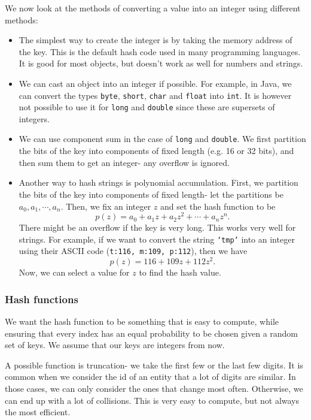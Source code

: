 \documentclass[a4paper, openany]{memoir}
\begin{document}
\noindent We now look at the methods of converting a value into an integer using different methods:
\begin{itemize}
    \item The simplest way to create the integer is by taking the memory address of the key. This is the default hash code used in many programming languages. It is good for most objects, but doesn't work as well for numbers and strings.
    \item We can cast an object into an integer if possible. For example, in Java, we can convert the types \texttt{byte}, \texttt{short}, \texttt{char} and \texttt{float} into \texttt{int}. It is however not possible to use it for \texttt{long} and \texttt{double} since these are supersets of integers.
    \item We can use component sum in the case of \texttt{long} and \texttt{double}. We first partition the bits of the key into components of fixed length (e.g. 16 or 32 bits), and then sum them to get an integer- any overflow is ignored.
    \item Another way to hash strings is polynomial accumulation. First, we partition the bits of the key into components of fixed length- let the partitions be $a_0, a_1, \cdots, a_n$. Then, we fix an integer $z$ and set the hash function to be
    \[p(z) = a_0 + a_1 z + a_2 z^2 + \cdots + a_n z^n.\]
    There might be an overflow if the key is very long. This works very well for strings. For example, if we want to convert the string \texttt{`tmp'} into an integer using their ASCII code (\texttt{t:116, m:109, p:112}), then we have
    \[p(z) = 116 + 109z + 112z^2.\]
    Now, we can select a value for $z$ to find the hash value.
\end{itemize}

\subsubsection{Hash functions}
We want the hash function to be something that is easy to compute, while ensuring that every index has an equal probability to be chosen given a random set of keys. We assume that our keys are integers from now.

\noindent A possible function is truncation- we take the first few or the last few digits. It is common when we consider the id of an entity that a lot of digits are similar. In those cases, we can only consider the ones that change most often. Otherwise, we can end up with a lot of collisions. This is very easy to compute, but not always the most efficient.
\end{document}
